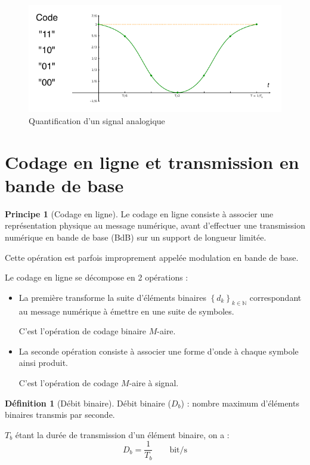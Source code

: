 \documentclass[11pt,english,french]{scrreprt}
\theoremstyle{remark}
\theoremstyle{definition}
\newtheorem*{def*}{Définition}
\newtheorem*{princ*}{Principe}
\begin{document}
\begin{figure}[h!]
	\center
	\includegraphics[scale=.7]{graphes/Quantification}
	\caption{Quantification d'un signal analogique}
\end{figure}

\section{Codage en ligne et transmission en bande de base} %

\begin{princ*}[Codage en ligne]
	Le codage en ligne consiste à associer une représentation physique au message numérique, avant d'effectuer une transmission numérique en bande de base (BdB) sur un support de longueur limitée. 
	
	Cette opération est parfois improprement appelée modulation en bande de base.
\end{princ*}

Le codage en ligne se décompose en 2 opérations :\begin{itemize}
	\item La première transforme la suite d'éléments binaires $\left\{d_k\right\}_{k\in\mathbb{N}}$ correspondant au message numérique à émettre en une suite de symboles. 
	
	C'est l'opération de codage binaire $M$-aire. 
	\item La seconde opération consiste à associer une forme d'onde à chaque symbole ainsi produit. 
	
	C'est l'opération de codage $M$-aire à signal.
\end{itemize}

\begin{def*}[Débit binaire]
	Débit binaire ($D_b$) : nombre maximum d'éléments binaires transmis par seconde.
	
	$T_b$ étant la durée de transmission d'un élément binaire, on a :
	\[
		D_b = \frac{1}{T_b} \qquad \textrm{bit/s}
	\]
\end{def*}
\end{document}
